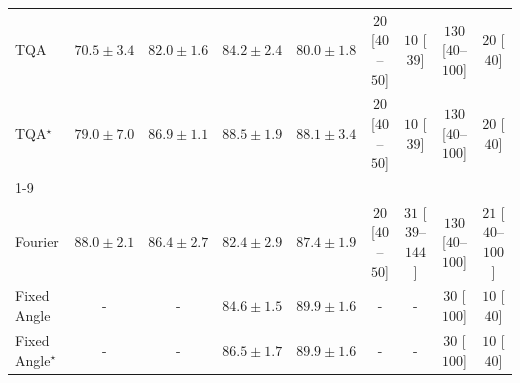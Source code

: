\begin{tabular}{l|cccc|cccc|}
TQA & {\cellcolor[HTML]{FFFBD0}} \color[HTML]{000000} $70.5\pm 3.4$ & {\cellcolor[HTML]{F98E23}} \color[HTML]{F1F1F1} $82.0\pm 1.6$ & {\cellcolor[HTML]{EC7014}} \color[HTML]{F1F1F1} $84.2\pm 2.4$ & {\cellcolor[HTML]{FEAA38}} \color[HTML]{000000} $80.0\pm 1.8$ & {\cellcolor[HTML]{FFF5F1}} \color[HTML]{000000} $20$ [$40$--$50$] & {\cellcolor[HTML]{FFF7F3}} \color[HTML]{000000} $10$ [$39$] & {\cellcolor[HTML]{FDDBD7}} \color[HTML]{000000} $130$ [$40$--$100$] & {\cellcolor[HTML]{FFF5F1}} \color[HTML]{000000} $20$ [$40$] \\
TQA$^\star$ & {\cellcolor[HTML]{FEB744}} \color[HTML]{000000} $79.0\pm 7.0$ & {\cellcolor[HTML]{CF5004}} \color[HTML]{F1F1F1} $86.9\pm 1.1$ & {\cellcolor[HTML]{B84203}} \color[HTML]{F1F1F1} $88.5\pm 1.9$ & {\cellcolor[HTML]{BE4503}} \color[HTML]{F1F1F1} $88.1\pm 3.4$ & {\cellcolor[HTML]{FFF5F1}} \color[HTML]{000000} $20$ [$40$--$50$] & {\cellcolor[HTML]{FFF7F3}} \color[HTML]{000000} $10$ [$39$] & {\cellcolor[HTML]{FDDBD7}} \color[HTML]{000000} $130$ [$40$--$100$] & {\cellcolor[HTML]{FFF5F1}} \color[HTML]{000000} $20$ [$40$] \\
\cline{1-9}
\multicolumn{9}{c}{\rule{0pt}{8pt}PP} \\
\midrule
Fourier & {\cellcolor[HTML]{1A7D40}} \color[HTML]{F1F1F1} $88.0\pm 2.1$ & {\cellcolor[HTML]{2C8F4B}} \color[HTML]{F1F1F1} $86.4\pm 2.7$ & {\cellcolor[HTML]{61BB6D}} \color[HTML]{F1F1F1} $82.4\pm 2.9$ & {\cellcolor[HTML]{218242}} \color[HTML]{F1F1F1} $87.4\pm 1.9$ & {\cellcolor[HTML]{FFF5F1}} \color[HTML]{000000} $20$ [$40$--$50$] & {\cellcolor[HTML]{FFF3EF}} \color[HTML]{000000} $31$ [$39$--$144$] & {\cellcolor[HTML]{FDDBD7}} \color[HTML]{000000} $130$ [$40$--$100$] & {\cellcolor[HTML]{FFF5F1}} \color[HTML]{000000} $21$ [$40$--$100$] \\
Fixed Angle & {\cellcolor[HTML]{000000}} \color[HTML]{F1F1F1} {\cellcolor{white}} \color{black} - & {\cellcolor[HTML]{000000}} \color[HTML]{F1F1F1} {\cellcolor{white}} \color{black} - & {\cellcolor[HTML]{3DA559}} \color[HTML]{F1F1F1} $84.6\pm 1.5$ & {\cellcolor[HTML]{056C39}} \color[HTML]{F1F1F1} $89.9\pm 1.6$ & {\cellcolor[HTML]{000000}} \color[HTML]{F1F1F1} {\cellcolor{white}} \color{black} - & {\cellcolor[HTML]{000000}} \color[HTML]{F1F1F1} {\cellcolor{white}} \color{black} - & {\cellcolor[HTML]{FFF3EF}} \color[HTML]{000000} $30$ [$100$] & {\cellcolor[HTML]{FFF7F3}} \color[HTML]{000000} $10$ [$40$] \\
Fixed Angle$^\star$ & {\cellcolor[HTML]{000000}} \color[HTML]{F1F1F1} {\cellcolor{white}} \color{black} - & {\cellcolor[HTML]{000000}} \color[HTML]{F1F1F1} {\cellcolor{white}} \color{black} - & {\cellcolor[HTML]{2B8E4A}} \color[HTML]{F1F1F1} $86.5\pm 1.7$ & {\cellcolor[HTML]{056C39}} \color[HTML]{F1F1F1} $89.9\pm 1.6$ & {\cellcolor[HTML]{000000}} \color[HTML]{F1F1F1} {\cellcolor{white}} \color{black} - & {\cellcolor[HTML]{000000}} \color[HTML]{F1F1F1} {\cellcolor{white}} \color{black} - & {\cellcolor[HTML]{FFF3EF}} \color[HTML]{000000} $30$ [$100$] & {\cellcolor[HTML]{FFF7F3}} \color[HTML]{000000} $10$ [$40$] \\

\end{tabular}
